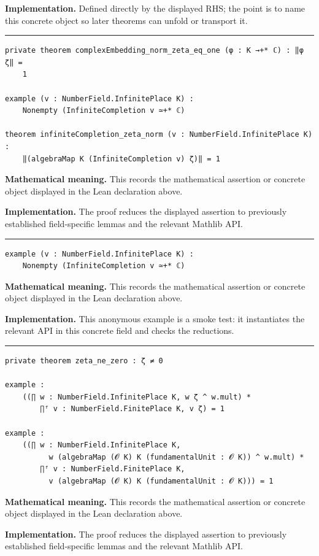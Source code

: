 \documentclass[UTF8,a4paper,11pt,fontset=fandol]{ctexart}
\theoremstyle{definition}
\newcommand{\statementsep}{\par\medskip\hrule\medskip}
\begin{document}
\noindent\textbf{Implementation.} Defined directly by the displayed RHS; the point is to name this concrete object so later theorems can unfold or transport it.\par
\statementsep
\begin{verbatim}
private theorem complexEmbedding_norm_zeta_eq_one (φ : K →+* ℂ) : ‖φ ζ‖ =
    1

example (v : NumberField.InfinitePlace K) :
    Nonempty (InfiniteCompletion v ≃+* ℂ)

theorem infiniteCompletion_zeta_norm (v : NumberField.InfinitePlace K) :
    ‖(algebraMap K (InfiniteCompletion v) ζ)‖ = 1
\end{verbatim}
\noindent\textbf{Mathematical meaning.} This records the mathematical assertion or concrete object displayed in the Lean declaration above.\par
\noindent\textbf{Implementation.} The proof reduces the displayed assertion to previously established field-specific lemmas and the relevant Mathlib API.\par
\statementsep
\begin{verbatim}
example (v : NumberField.InfinitePlace K) :
    Nonempty (InfiniteCompletion v ≃+* ℂ)
\end{verbatim}
\noindent\textbf{Mathematical meaning.} This records the mathematical assertion or concrete object displayed in the Lean declaration above.\par
\noindent\textbf{Implementation.} This anonymous example is a smoke test: it instantiates the relevant API in this concrete field and checks the reductions.\par
\statementsep
\begin{verbatim}
private theorem zeta_ne_zero : ζ ≠ 0

example :
    ((∏ w : NumberField.InfinitePlace K, w ζ ^ w.mult) *
        ∏ᶠ v : NumberField.FinitePlace K, v ζ) = 1

example :
    ((∏ w : NumberField.InfinitePlace K,
          w (algebraMap (𝓞 K) K (fundamentalUnit : 𝓞 K)) ^ w.mult) *
        ∏ᶠ v : NumberField.FinitePlace K,
          v (algebraMap (𝓞 K) K (fundamentalUnit : 𝓞 K))) = 1
\end{verbatim}
\noindent\textbf{Mathematical meaning.} This records the mathematical assertion or concrete object displayed in the Lean declaration above.\par
\noindent\textbf{Implementation.} The proof reduces the displayed assertion to previously established field-specific lemmas and the relevant Mathlib API.\par
\end{document}
